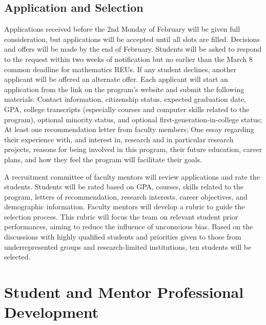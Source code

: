 \documentclass[11pt]{NSFamsart}
\begin{document}
\subsection{Application and Selection} 
Applications received before the 2nd Monday of February will be given full consideration, but applications will be accepted until all slots are filled. Decisions and offers will be made by the end of February. Students will be asked to respond to the request within two weeks of notification but no earlier than the March 8 common deadline for mathematics REUs. If any student declines, another applicant will be offered an alternate offer. 
Each applicant will start an application from the link on the program’s
website and submit the following materials: 
Contact information, citizenship status, expected graduation date, GPA, college transcripts (especially courses and computer skills related to the program),
optional minority status, and optional first-generation-in-college status;
At least one recommendation
letter from faculty members; 
One essay regarding their experience with, and interest in, research and in particular research projects, reasons for being involved in this program, their future
education, career plans, and how they feel the program will facilitate their goals. 

A recruitment committee of faculty mentors will review applications and rate the students. Students
will be rated based on GPA, courses, skills related to the program, letters of recommendation,
research interests, career objectives, and demographic information. Faculty mentors
will develop a rubric to guide the selection
process. This rubric will focus the team on relevant student prior performances, aiming to reduce the
influence of unconscious bias. Based on the
discussions with highly qualified students and priorities given to those from  underrepresented
groups and research-limited institutions, ten students will be selected.


\section{Student and Mentor Professional Development}
\end{document}

